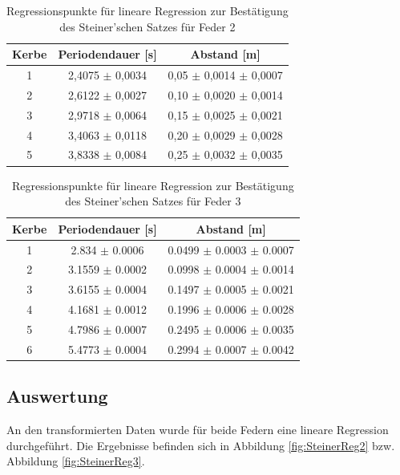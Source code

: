 \documentclass[12pt,a4paper]{article}
\begin{document}
\begin{table}
\caption{Regressionspunkte für lineare Regression zur Bestätigung des Steiner'schen Satzes für Feder 2}
\label{tab:linReg_Punkte_Steiner_Feder2}
\begin{center}
\begin{tabular}{|c|c|c|}
\hline 
Kerbe & Periodendauer [s] & Abstand [m] \\ 
\hline 
1 & 2,4075 $\pm$ 0,0034 & 0,05 $\pm$ 0,0014 $\pm$ 0,0007 \\ 
\hline 
2 & 2,6122 $\pm$ 0,0027 & 0,10 $\pm$ 0,0020 $\pm$ 0,0014 \\ 
\hline 
3 & 2,9718 $\pm$ 0,0064 & 0,15 $\pm$ 0,0025 $\pm$ 0,0021 \\ 
\hline 
4 & 3,4063 $\pm$ 0,0118 & 0,20 $\pm$ 0,0029 $\pm$ 0,0028 \\ 
\hline 
5 & 3,8338 $\pm$ 0,0084 & 0,25 $\pm$ 0,0032 $\pm$ 0,0035 \\ 
\hline 
\end{tabular} 
\end{center}
\end{table}

\begin{table}
\caption{Regressionspunkte für lineare Regression zur Bestätigung des Steiner'schen Satzes für Feder 3}
\label{tab:linReg_Punkte_Steiner_Feder3}
\begin{center}
\begin{tabular}{|c|c|c|}
\hline 
Kerbe & Periodendauer [s] & Abstand [m] \\ 
\hline
1 & 2.834 $\pm$ 0.0006 & 0.0499 $\pm$ 0.0003 $\pm$ 0.0007 \\
\hline
2 & 3.1559 $\pm$ 0.0002 & 0.0998 $\pm$ 0.0004 $\pm$ 0.0014 \\
\hline
3 & 3.6155 $\pm$ 0.0004 & 0.1497 $\pm$ 0.0005 $\pm$ 0.0021 \\
\hline
4 & 4.1681 $\pm$ 0.0012 & 0.1996 $\pm$ 0.0006 $\pm$ 0.0028 \\
\hline
5 & 4.7986 $\pm$ 0.0007 & 0.2495 $\pm$ 0.0006 $\pm$ 0.0035 \\
\hline
6 & 5.4773 $\pm$ 0.0004 & 0.2994 $\pm$ 0.0007 $\pm$ 0.0042 \\
\hline
\end{tabular} 
\end{center}
\end{table}

\subsection{Auswertung}
An den transformierten Daten wurde für beide Federn eine lineare Regression durchgeführt. Die Ergebnisse befinden sich in Abbildung \ref{fig:SteinerReg2} bzw. Abbildung \ref{fig:SteinerReg3}.
\end{document}
